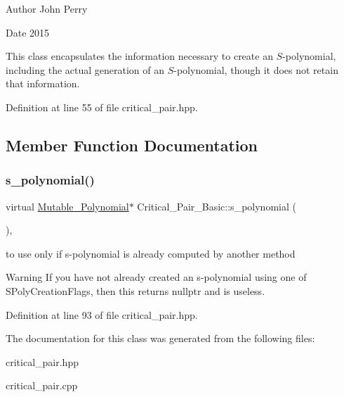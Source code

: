 \begin{DoxyAuthor}{Author}
John Perry 
\end{DoxyAuthor}
\begin{DoxyDate}{Date}
2015
\end{DoxyDate}
This class encapsulates the information necessary to create an $S$-\/polynomial, including the actual generation of an $S$-\/polynomial, though it does not retain that information. 

Definition at line 55 of file critical\+\_\+pair.\+hpp.



\subsection{Member Function Documentation}
\mbox{\label{class_critical___pair___basic_ab2dbac89b07b2acfad633a9de8f56fab}} 
\subsubsection{\texorpdfstring{s\+\_\+polynomial()}{s\_polynomial()}}
{\footnotesize\ttfamily virtual \hyperlink{class_mutable___polynomial}{Mutable\+\_\+\+Polynomial}$\ast$ Critical\+\_\+\+Pair\+\_\+\+Basic\+::s\+\_\+polynomial (\begin{DoxyParamCaption}{ }\end{DoxyParamCaption})\hspace{0.3cm}{\ttfamily [inline]}, {\ttfamily [virtual]}}



to use only if s-\/polynomial is already computed by another method 

\begin{DoxyWarning}{Warning}
If you have not already created an s-\/polynomial using one of S\+Poly\+Creation\+Flags, then this returns {\ttfamily nullptr} and is useless. 
\end{DoxyWarning}


Definition at line 93 of file critical\+\_\+pair.\+hpp.



The documentation for this class was generated from the following files\+:\begin{DoxyCompactItemize}
\item 
critical\+\_\+pair.\+hpp\item 
critical\+\_\+pair.\+cpp\end{DoxyCompactItemize}
